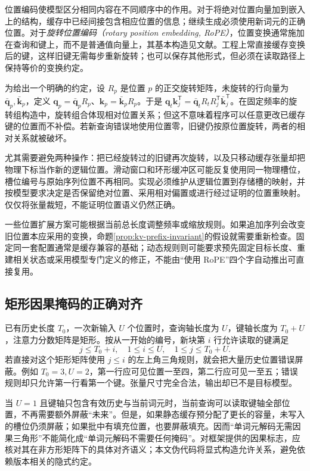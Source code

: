 \documentclass[UTF8,12pt,a4paper,fontset=fandol]{ctexart}
\begin{document}
位置编码使模型区分相同内容在不同顺序中的作用。对于将绝对位置向量加到嵌入上的结构，缓存中已经间接包含相应位置的信息；继续生成必须使用新词元的正确位置。对于\emph{旋转位置编码（rotary position embedding, RoPE）}，位置变换通常施加在查询和键上，而不是普通值向量上，其基本构造见文献\cite{rope}。工程上常直接缓存变换后的键，这样旧键无需每步重新旋转；也可以保存其他形式，但必须在读取路径上保持等价的变换约定。

为给出一个明确的约定，设 $R_p$ 是位置 $p$ 的正交旋转矩阵，未旋转的行向量为 $\bar{\mathbf q}_p,\bar{\mathbf k}_p$，定义 $\mathbf q_p=\bar{\mathbf q}_pR_p$、$\mathbf k_p=\bar{\mathbf k}_pR_p$。于是 $\mathbf q_t\mathbf k_j^{\mathsf T}=\bar{\mathbf q}_tR_tR_j^{\mathsf T}\bar{\mathbf k}_j^{\mathsf T}$。在固定频率的旋转组构造中，旋转组合体现相对位置关系；但这不意味着程序可以任意更改已缓存键的位置而不补偿。若新查询错误地使用位置零，旧键仍按原位置旋转，两者的相对关系就被破坏。

尤其需要避免两种操作：把已经旋转过的旧键再次旋转，以及只移动缓存张量却把物理下标当作新的逻辑位置。滑动窗口和环形缓冲区可能反复使用同一物理槽位，槽位编号与原始序列位置不再相同。实现必须维护从逻辑位置到存储槽的映射，并按模型要求决定是否保留绝对位置、采用相对偏置或进行经过证明的位置重映射。仅仅将张量裁短，不能证明位置语义仍然正确。

一些位置扩展方案可能根据当前总长度调整频率或缩放规则。如果追加序列会改变旧位置本应采用的变换，命题\ref{prop:kv-prefix-invariant}的假设就需要重新检查。固定同一套配置通常是缓存兼容的基础；动态规则则可能要求预先固定目标长度、重建相关状态或采用模型专门定义的修正，不能由“使用 RoPE”四个字自动推出可直接复用。

\subsection{矩形因果掩码的正确对齐}

已有历史长度 $T_0$，一次新输入 $U$ 个位置时，查询轴长度为 $U$，键轴长度为 $T_0+U$，注意力分数矩阵是矩形。按从一开始的编号，新块第 $i$ 行允许读取的键满足
\begin{equation}
 j\leq T_0+i,\quad 1\leq i\leq U,\quad 1\leq j\leq T_0+U.
 \label{eq:kv-rectangular-mask}
\end{equation}
若直接对这个矩形矩阵使用 $j\leq i$ 的左上角三角规则，就会把大量历史位置错误屏蔽。例如 $T_0=3,U=2$，第一行应可见位置一至四，第二行应可见一至五；错误规则却只允许第一行看第一个键。张量尺寸完全合法，输出却已不是目标模型。

当 $U=1$ 且键轴只包含有效历史与当前词元时，当前查询可以读取键轴全部位置，不再需要额外屏蔽“未来”。但是，如果静态缓存预分配了更长的容量，未写入的槽位仍须屏蔽；如果批中有填充位置，也要屏蔽填充。因而“单词元解码无需因果三角形”不能简化成“单词元解码不需要任何掩码”。对框架提供的因果标志，应核对其在非方形矩阵下的具体对齐语义；本文伪代码将显式构造允许关系，避免依赖版本相关的隐式约定。
\end{document}
